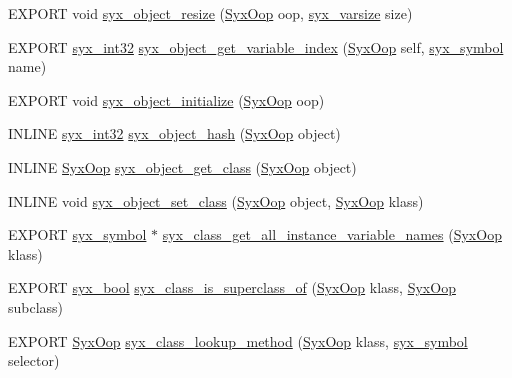 \begin{CompactItemize}
EXPORT void \hyperlink{syx-object_8h_8f1d632f929b4115e53dc9227ecac36b}{syx\_\-object\_\-resize} (\hyperlink{syx-types_8h_1121caba2d40b2ce090b640762744ccd}{SyxOop} oop, \hyperlink{syx-types_8h_18e1a1417591a1efb670b97ce320f535}{syx\_\-varsize} size)
\item 
EXPORT \hyperlink{syx-types_8h_9f31c17555a2dfcf25da84b5c4a2e55b}{syx\_\-int32} \hyperlink{syx-object_8h_a0cd5dad65ba23e0dc1381396b283ab8}{syx\_\-object\_\-get\_\-variable\_\-index} (\hyperlink{syx-types_8h_1121caba2d40b2ce090b640762744ccd}{SyxOop} self, \hyperlink{syx-types_8h_9663af54b7b72f5d8be5f754ef356525}{syx\_\-symbol} name)
\item 
EXPORT void \hyperlink{syx-object_8h_00a861ab5f7d7224796beb8f9bf42296}{syx\_\-object\_\-initialize} (\hyperlink{syx-types_8h_1121caba2d40b2ce090b640762744ccd}{SyxOop} oop)
\item 
INLINE \hyperlink{syx-types_8h_9f31c17555a2dfcf25da84b5c4a2e55b}{syx\_\-int32} \hyperlink{syx-object_8h_d8c2625c436ff85103279e5d78f078a5}{syx\_\-object\_\-hash} (\hyperlink{syx-types_8h_1121caba2d40b2ce090b640762744ccd}{SyxOop} object)
\item 
INLINE \hyperlink{syx-types_8h_1121caba2d40b2ce090b640762744ccd}{SyxOop} \hyperlink{syx-object_8h_88d1e4f8e61fb948d275e3900cec21fe}{syx\_\-object\_\-get\_\-class} (\hyperlink{syx-types_8h_1121caba2d40b2ce090b640762744ccd}{SyxOop} object)
\item 
INLINE void \hyperlink{syx-object_8h_9c6faeef861a4eb3e3fb37ce9f8126f3}{syx\_\-object\_\-set\_\-class} (\hyperlink{syx-types_8h_1121caba2d40b2ce090b640762744ccd}{SyxOop} object, \hyperlink{syx-types_8h_1121caba2d40b2ce090b640762744ccd}{SyxOop} klass)
\item 
EXPORT \hyperlink{syx-types_8h_9663af54b7b72f5d8be5f754ef356525}{syx\_\-symbol} $\ast$ \hyperlink{syx-object_8h_9023e67e65ca397b1fb0a54e71879d0f}{syx\_\-class\_\-get\_\-all\_\-instance\_\-variable\_\-names} (\hyperlink{syx-types_8h_1121caba2d40b2ce090b640762744ccd}{SyxOop} klass)
\item 
EXPORT \hyperlink{syx-types_8h_c6dc09b276b99fa1956364359139daab}{syx\_\-bool} \hyperlink{syx-object_8h_3c39f91fa6304f6180cdb9888990ab75}{syx\_\-class\_\-is\_\-superclass\_\-of} (\hyperlink{syx-types_8h_1121caba2d40b2ce090b640762744ccd}{SyxOop} klass, \hyperlink{syx-types_8h_1121caba2d40b2ce090b640762744ccd}{SyxOop} subclass)
\item 
EXPORT \hyperlink{syx-types_8h_1121caba2d40b2ce090b640762744ccd}{SyxOop} \hyperlink{syx-object_8h_fbffd7cc207f40f18ba6da769f214ed4}{syx\_\-class\_\-lookup\_\-method} (\hyperlink{syx-types_8h_1121caba2d40b2ce090b640762744ccd}{SyxOop} klass, \hyperlink{syx-types_8h_9663af54b7b72f5d8be5f754ef356525}{syx\_\-symbol} selector)

\end{CompactItemize}
